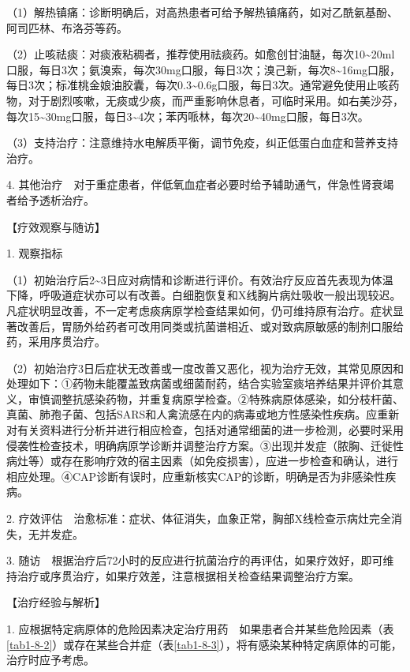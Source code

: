 （1）解热镇痛：诊断明确后，对高热患者可给予解热镇痛药，如对乙酰氨基酚、阿司匹林、布洛芬等药。

（2）止咳祛痰：对痰液粘稠者，推荐使用祛痰药。如愈创甘油醚，每次10\textasciitilde{}20ml口服，每日3次；氨溴索，每次30mg口服，每日3次；溴己新，每次8\textasciitilde{}16mg口服，每日3次；标准桃金娘油胶囊，每次0.3\textasciitilde{}0.6g口服，每日3次。通常避免使用止咳药物，对于剧烈咳嗽，无痰或少痰，而严重影响休息者，可临时采用。如右美沙芬，每次15\textasciitilde{}30mg口服，每日3\textasciitilde{}4次；苯丙哌林，每次20\textasciitilde{}40mg口服，每日3次。

（3）支持治疗：注意维持水电解质平衡，调节免疫，纠正低蛋白血症和营养支持治疗。

4.
其他治疗　对于重症患者，伴低氧血症者必要时给予辅助通气，伴急性肾衰竭者给予透析治疗。

【疗效观察与随访】

1. 观察指标

（1）初始治疗后2\textasciitilde{}3日应对病情和诊断进行评价。有效治疗反应首先表现为体温下降，呼吸道症状亦可以有改善。白细胞恢复和X线胸片病灶吸收一般出现较迟。凡症状明显改善，不一定考虑痰病原学检查结果如何，仍可维持原有治疗。症状显著改善后，胃肠外给药者可改用同类或抗菌谱相近、或对致病原敏感的制剂口服给药，采用序贯治疗。

（2）初始治疗3日后症状无改善或一度改善又恶化，视为治疗无效，其常见原因和处理如下：①药物未能覆盖致病菌或细菌耐药，结合实验室痰培养结果并评价其意义，审慎调整抗感染药物，并重复病原学检查。②特殊病原体感染，如分枝杆菌、真菌、肺孢子菌、包括SARS和人禽流感在内的病毒或地方性感染性疾病。应重新对有关资料进行分析并进行相应检查，包括对通常细菌的进一步检测，必要时采用侵袭性检查技术，明确病原学诊断并调整治疗方案。③出现并发症（脓胸、迁徙性病灶等）或存在影响疗效的宿主因素（如免疫损害），应进一步检查和确认，进行相应处理。④CAP诊断有误时，应重新核实CAP的诊断，明确是否为非感染性疾病。

2.
疗效评估　治愈标准：症状、体征消失，血象正常，胸部X线检查示病灶完全消失，无并发症。

3.
随访　根据治疗后72小时的反应进行抗菌治疗的再评估，如果疗效好，即可维持治疗或序贯治疗，如果疗效差，注意根据相关检查结果调整治疗方案。

【治疗经验与解析】

1.
应根据特定病原体的危险因素决定治疗用药　如果患者合并某些危险因素（表\ref{tab1-8-2}）或存在某些合并症（表\ref{tab1-8-3}），将有感染某种特定病原体的可能，治疗时应予考虑。


